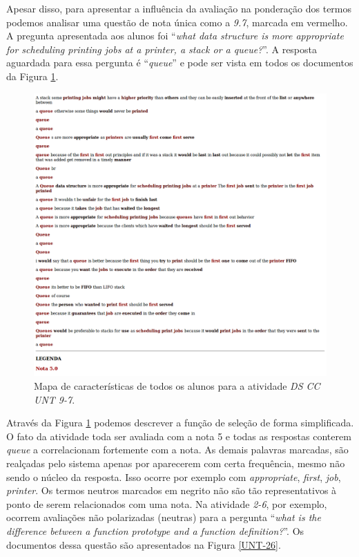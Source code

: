 Apesar disso, para apresentar a influência da avaliação na ponderação dos termos podemos analisar uma questão de nota única como a \textit{9.7}, marcada em vermelho. A pregunta apresentada aos alunos foi ``\textit{what data structure is more appropriate for scheduling printing jobs at a printer, a stack or a queue?}''. A resposta aguardada para essa pergunta é ``\textit{queue}'' e pode ser vista em todos os documentos da Figura \ref{UNT-97}.

\begin{figure}[h!]
\centering
\includegraphics[width=\textwidth]{img/UNT-9-7.png}
\caption{Mapa de características de todos os alunos para a atividade \textit{DS CC UNT 9-7}.}
\label{UNT-97}
\end{figure}

Através da Figura \ref{UNT-97} podemos descrever a função de seleção de forma simplificada. O fato da atividade toda ser avaliada com a nota 5 e todas as respostas conterem \textit{queue} a correlacionam fortemente com a nota. As demais palavras marcadas, são realçadas pelo sistema apenas por aparecerem com certa frequência, mesmo não sendo o núcleo da resposta. Isso ocorre por exemplo com \textit{appropriate}, \textit{first}, \textit{job}, \textit{printer}. Os termos neutros marcados em negrito não são tão representativos à ponto de serem relacionados com uma nota. Na atividade \textit{2-6}, por exemplo, ocorrem avaliações não polarizadas (neutras) para a pergunta ``\textit{what is the difference between a function prototype and a function definition?}''. Os documentos dessa questão são apresentados na Figura \ref{UNT-26}.

